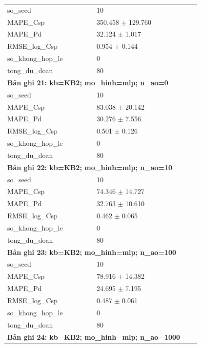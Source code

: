 \begin{longtable}{p{0.43\linewidth}p{0.50\linewidth}}
so\_\allowbreak seed & 10 \\
MAPE\_\allowbreak Csp & 350.458 $\pm$ 129.760 \\
MAPE\_\allowbreak Pd & 32.124 $\pm$ 1.017 \\
RMSE\_\allowbreak log\_\allowbreak Csp & 0.954 $\pm$ 0.144 \\
so\_\allowbreak khong\_\allowbreak hop\_\allowbreak le & 0 \\
tong\_\allowbreak du\_\allowbreak doan & 80 \\
\midrule
\multicolumn{2}{p{0.95\linewidth}}{\textbf{Bản ghi 21: kb=KB2; mo\_hinh=mlp; n\_ao=0}} \\
so\_\allowbreak seed & 10 \\
MAPE\_\allowbreak Csp & 83.038 $\pm$ 20.142 \\
MAPE\_\allowbreak Pd & 30.276 $\pm$ 7.556 \\
RMSE\_\allowbreak log\_\allowbreak Csp & 0.501 $\pm$ 0.126 \\
so\_\allowbreak khong\_\allowbreak hop\_\allowbreak le & 0 \\
tong\_\allowbreak du\_\allowbreak doan & 80 \\
\midrule
\multicolumn{2}{p{0.95\linewidth}}{\textbf{Bản ghi 22: kb=KB2; mo\_hinh=mlp; n\_ao=10}} \\
so\_\allowbreak seed & 10 \\
MAPE\_\allowbreak Csp & 74.346 $\pm$ 14.727 \\
MAPE\_\allowbreak Pd & 32.763 $\pm$ 10.610 \\
RMSE\_\allowbreak log\_\allowbreak Csp & 0.462 $\pm$ 0.065 \\
so\_\allowbreak khong\_\allowbreak hop\_\allowbreak le & 0 \\
tong\_\allowbreak du\_\allowbreak doan & 80 \\
\midrule
\multicolumn{2}{p{0.95\linewidth}}{\textbf{Bản ghi 23: kb=KB2; mo\_hinh=mlp; n\_ao=100}} \\
so\_\allowbreak seed & 10 \\
MAPE\_\allowbreak Csp & 78.916 $\pm$ 14.382 \\
MAPE\_\allowbreak Pd & 24.695 $\pm$ 7.195 \\
RMSE\_\allowbreak log\_\allowbreak Csp & 0.487 $\pm$ 0.061 \\
so\_\allowbreak khong\_\allowbreak hop\_\allowbreak le & 0 \\
tong\_\allowbreak du\_\allowbreak doan & 80 \\
\midrule
\multicolumn{2}{p{0.95\linewidth}}{\textbf{Bản ghi 24: kb=KB2; mo\_hinh=mlp; n\_ao=1000}} \\

\end{longtable}
